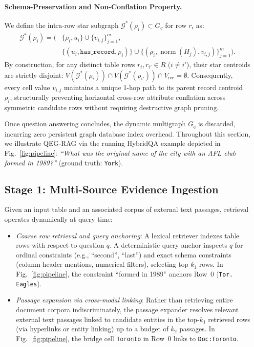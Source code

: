 \documentclass[runningheads]{llncs}
\begin{document}
\paragraph{Schema-Preservation and Non-Conflation Property.}
We define the intra-row star subgraph $\mathcal{G}^*(\rho_i) \subset G_q$ for row $r_i$ as:
\begin{equation}
\label{eq:star-subgraph}
\begin{aligned}
\mathcal{G}^*(\rho_i) = \Big( &\{\rho_i, u_i\} \cup \{v_{i,j}\}_{j=1}^m, \\
&\{(u_i, \texttt{has\_record}, \rho_i)\} \cup \{(\rho_i, \operatorname{norm}(H_j), v_{i,j})\}_{j=1}^m \Big).
\end{aligned}
\end{equation}
By construction, for any distinct table rows $r_i, r_{i'} \in R$ ($i \neq i'$), their star centroids are strictly disjoint: $V(\mathcal{G}^*(\rho_i)) \cap V(\mathcal{G}^*(\rho_{i'})) \cap V_{\text{rec}} = \emptyset$. Consequently, every cell value $v_{i,j}$ maintains a unique 1-hop path to its parent record centroid $\rho_i$, structurally preventing horizontal cross-row attribute conflation across symmetric candidate rows without requiring destructive graph pruning.

Once question answering concludes, the dynamic multigraph $G_q$ is discarded, incurring zero persistent graph database index overhead. Throughout this section, we illustrate QEG-RAG via the running HybridQA example depicted in Fig.~\ref{fig:pipeline}: \textit{``What was the original name of the city with an AFL club formed in 1989?''} (ground truth: \texttt{York}).

\subsection{Stage 1: Multi-Source Evidence Ingestion}
\label{sec:method-retrieval}
Given an input table and an associated corpus of external text passages, retrieval operates dynamically at query time:
\begin{itemize}[leftmargin=1.5em]
    \item \emph{Coarse row retrieval and query anchoring}: A lexical retriever indexes table rows with respect to question $q$. A deterministic query anchor inspects $q$ for ordinal constraints (e.g., ``second'', ``last'') and exact schema constraints (column header mentions, numerical filters), selecting top-$k_1$ rows. In Fig.~\ref{fig:pipeline}, the constraint ``formed in 1989'' anchors Row~0 (\texttt{Tor. Eagles}).
    \item \emph{Passage expansion via cross-modal linking}: Rather than retrieving entire document corpora indiscriminately, the passage expander resolves relevant external text passages linked to candidate entities in the top-$k_1$ retrieved rows (via hyperlinks or entity linking) up to a budget of $k_2$ passages. In Fig.~\ref{fig:pipeline}, the bridge cell \texttt{Toronto} in Row~0 links to \texttt{Doc:Toronto}.
\end{itemize}
\end{document}
